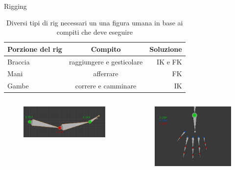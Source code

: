 \documentclass[10pt]{beamer}
\begin{document}
\begin{frame}{Rigging}	%
  \begin{table}					%
					\caption{Diversi tipi di rig necessari un una figura umana in base ai compiti che deve eseguire}
		\begin{tabular}{lcr}%
			\toprule
			Porzione del rig & Compito & Soluzione\\
			\midrule
			Braccia & raggiungere e gesticolare & IK e FK\\
			Mani & afferrare & FK\\
			Gambe & correre e camminare & IK\\
			\bottomrule
		\end{tabular}
	\end{table}	
  \begin{columns}[T,onlytextwidth]
    \begin{figure}
      \includegraphics[width=.9\linewidth]{figures/arm}
    \end{figure}
    \begin{figure}
      \includegraphics[width=.9\linewidth]{figures/hand}

\end{figure}
\end{columns}
\end{frame}
\end{document}
